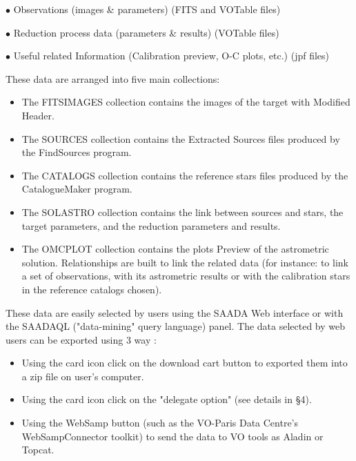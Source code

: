$\bullet$ Observations (images \& parameters) (FITS and VOTable files)

$\bullet$ Reduction process data (parameters \& results) (VOTable files)

$\bullet$ Useful related Information (Calibration preview, O-C plots, etc.) (jpf files)
\newpage

\noindent These data are arranged into five main collections: 

\begin{itemize}
\item The FITSIMAGES collection contains the images of the target with Modified Header.
\item The SOURCES collection contains the Extracted Sources files produced by the FindSources program.
\item The CATALOGS collection contains the reference stars files produced by the CatalogueMaker program.
\item The SOLASTRO collection contains the link between sources and stars, the target parameters, and the reduction parameters and results.
\item The OMCPLOT collection contains the plots Preview of the astrometric solution. Relationships are built to link the related data (for instance: to link a set of observations, with its astrometric results or with the calibration stars in the reference catalogs chosen).
\end{itemize}

These data are easily selected by users using the SAADA Web interface  or with the SAADAQL ("data-mining" query language) panel. The data selected by web users can be exported using 3 way :
\begin{itemize}
\item Using the card icon click on the download cart button to exported them into a zip file on user's computer.
\item Using the card icon click on the "delegate option" (see details in \S 4).
\item Using the WebSamp button (such as the VO-Paris Data Centre's WebSampConnector toolkit) to send the data to VO tools as Aladin or Topcat.
\end{itemize}


